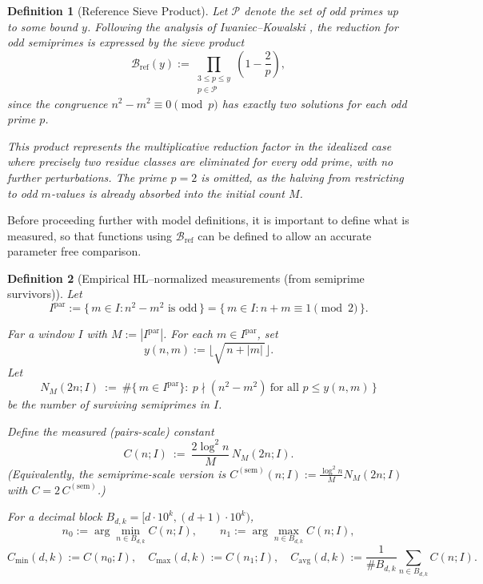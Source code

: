 \documentclass[11pt]{article}
\theoremstyle{inline}
\theoremstyle{break}
\theoremstyle{break}
\theoremstyle{break}
\theoremstyle{break}
\theoremstyle{break}
\newtheorem{definition}{Definition}
\theoremstyle{inline}
\newcommand{\tavg}{{\scriptscriptstyle\mathrm{avg}}}
\newcommand{\tref}{{\scriptscriptstyle\mathrm{ref}}}
\newcommand{\Cmeas}{C}              %
\newcommand{\Nmeas}{n}              %
\newcommand{\Bref}{\mathcal{B}_\tref}
\newcommand{\Ipar}{I^{\mathrm{par}}}
\begin{document}
\begin{definition}[Reference Sieve Product]
\label{def:Bref}
Let \( \mathcal{P} \) denote the set of odd primes up to some bound \( y \).
Following the analysis of Iwaniec–Kowalski \cite{IwaniecKowalski2004}, the reduction for odd semiprimes is expressed by the sieve product
\begin{equation}
\Bref(y)
    := \prod_{\substack{3 \le p \le y \\ p \in \mathcal{P}}}
       \left( 1 - \frac{2}{p} \right),
\end{equation}
since the congruence \( n^2 - m^2 \equiv 0 \pmod{p} \) has exactly two solutions for each odd prime \( p \).

This product represents the multiplicative reduction factor in the
\emph{idealized} case where precisely two residue classes are eliminated
for every odd prime, with no further perturbations. The prime \( p = 2 \)
is omitted, as the halving from restricting to odd \( m \)-values is already
absorbed into the initial count \( M \).
\end{definition}

Before proceeding further with model definitions, it is important to define what is measured, so that functions using \( \Bref \) can be 
defined to allow an accurate parameter free comparison.

\begin{definition}[Empirical HL–normalized measurements (from semiprime survivors)]\label{semiprime-survivors}
Let
\begin{equation}
\Ipar := \{\, m\in I : n^2-m^2 \text{ is odd} \,\}
= \{\, m\in I : n+m \equiv 1 \pmod 2 \,\}.
\end{equation}

Far a window \(I\) with \(M:=\left|\Ipar\right|\).
For each \( m \in \Ipar \), set
\begin{equation}
y(n,m):=\bigl\lfloor \sqrt{\,n+|m|\,}\bigr\rfloor .
\end{equation}
Let
\begin{equation}
N_M(2n;I)\ :=\ \#\{\,m\in \Ipar\}:\ p\nmid (n^2-m^2)\ \text{for all }p\le y(n,m)\,\}
\end{equation}
be the number of surviving \emph{semiprimes} in \(I\).

Define the measured (pairs-scale) constant
\begin{equation}
\Cmeas(n;I)\ :=\ \frac{2\log^2 n}{M}\,N_M(2n;I).
\end{equation}
(Equivalently, the semiprime-scale version is
\(\Cmeas^{(\mathrm{sem})}(n;I):=\frac{\log^2 n}{M}N_M(2n;I)\) with
\(\Cmeas=2\,\Cmeas^{(\mathrm{sem})}\).)

For a decimal block \(B_{d,k}=[d\cdot10^k,(d+1)\cdot10^k)\),
\begin{equation}
\Nmeas_0:=\arg\min_{n\in B_{d,k}}\Cmeas(n;I),\qquad
\Nmeas_1:=\arg\max_{n\in B_{d,k}}\Cmeas(n;I),
\end{equation}
\begin{equation}
\Cmeas_{\min}(d,k):=\Cmeas(\Nmeas_0;I),\quad
\Cmeas_{\max}(d,k):=\Cmeas(\Nmeas_1;I),\quad
\Cmeas_{\tavg}(d,k):=\frac{1}{\#B_{d,k}}\sum_{n\in B_{d,k}}\Cmeas(n;I).
\end{equation}
\end{definition}
\end{document}
